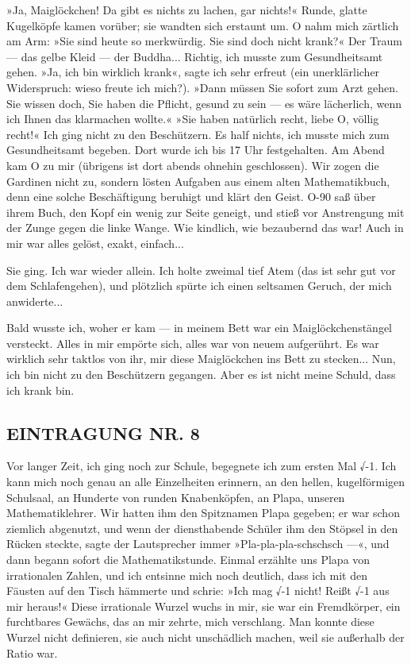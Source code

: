 »Ja, Maiglöckchen! Da gibt es nichts zu lachen, gar nichts!« Runde,
glatte Kugelköpfe kamen vorüber; sie wandten sich erstaunt um. O
nahm mich zärtlich am Arm: »Sie sind heute so merkwürdig. Sie sind
doch nicht krank?« Der Traum — das gelbe Kleid — der Buddha...
Richtig, ich musste zum Gesundheitsamt gehen. »Ja, ich bin wirklich
krank«, sagte ich sehr erfreut (ein unerklärlicher Widerspruch:
wieso freute ich mich?). »Dann müssen Sie sofort zum Arzt gehen.
Sie wissen doch, Sie haben die Pflicht, gesund zu sein — es wäre
lächerlich, wenn ich Ihnen das klarmachen wollte.« »Sie haben
natürlich recht, liebe O, völlig recht!« Ich ging nicht zu den
Beschützern. Es half nichts, ich musste mich zum Gesundheitsamt
begeben. Dort wurde ich bis 17 Uhr festgehalten. Am Abend kam O zu
mir (übrigens ist dort abends ohnehin geschlossen). Wir zogen die
Gardinen nicht zu, sondern lösten Aufgaben aus einem alten
Mathematikbuch, denn eine solche Beschäftigung beruhigt und klärt
den Geist. O-90 saß über ihrem Buch, den Kopf ein wenig zur Seite
geneigt, und stieß vor Anstrengung mit der Zunge gegen die linke
Wange. Wie kindlich, wie bezaubernd das war! Auch in mir war alles
gelöst, exakt, einfach...

Sie ging. Ich war wieder allein. Ich holte zweimal tief Atem (das
ist sehr gut vor dem Schlafengehen), und plötzlich spürte ich einen
seltsamen Geruch, der mich anwiderte...

Bald wusste ich, woher er kam — in meinem Bett war ein
Maiglöckchenstängel versteckt. Alles in mir empörte sich, alles war
von neuem aufgerührt. Es war wirklich sehr taktlos von ihr, mir
diese Maiglöckchen ins Bett zu stecken... Nun, ich bin nicht zu den
Beschützern gegangen. Aber es ist nicht meine Schuld, dass ich
krank bin.

\subsection{EINTRAGUNG NR. 8}

Vor langer Zeit, ich ging noch zur Schule, begegnete ich zum ersten
Mal √-1. Ich kann mich noch genau an alle Einzelheiten erinnern, an
den hellen, kugelförmigen Schulsaal, an Hunderte von runden
Knabenköpfen, an Plapa, unseren Mathematiklehrer. Wir hatten ihm
den Spitznamen Plapa gegeben; er war schon ziemlich abgenutzt, und
wenn der diensthabende Schüler ihm den Stöpsel in den Rücken
steckte, sagte der Lautsprecher immer »Pla-pla-pla-schschsch —«,
und dann begann sofort die Mathematikstunde. Einmal erzählte uns
Plapa von irrationalen Zahlen, und ich entsinne mich noch deutlich,
dass ich mit den Fäusten auf den Tisch hämmerte und schrie: »Ich
mag √-1 nicht! Reißt √-1 aus mir heraus!« Diese irrationale Wurzel
wuchs in mir, sie war ein Fremdkörper, ein furchtbares Gewächs, das
an mir zehrte, mich verschlang. Man konnte diese Wurzel nicht
definieren, sie auch nicht unschädlich machen, weil sie außerhalb
der Ratio war.

